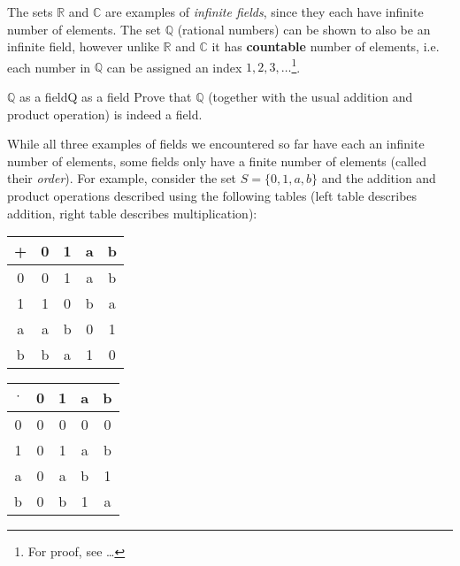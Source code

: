The sets $\mathbb{R}$ and $\mathbb{C}$ are examples of \emph{infinite fields}, since they each have infinite number of elements. The set $\mathbb{Q}$ (rational numbers) can be shown to also be an infinite field, however unlike $\mathbb{R}$ and $\mathbb{C}$ it has \textbf{countable} number of elements, i.e. each number in $\mathbb{Q}$ can be assigned an index $1,2,3,\dots$\footnote{For proof, see \ldots}.

\begin{challange}{$\bm{\mathbb{Q}}$ as a field}{Q as a field}
	Prove that $\mathbb{Q}$ (together with the usual addition and product operation) is indeed a field.
\end{challange}

While all three examples of fields we encountered so far have each an infinite number of elements, some fields only have a finite number of elements (called their \emph{order}). For example, consider the set $S=\{0,1,a,b\}$ and the addition and product operations described using the following tables (left table describes addition, right table describes multiplication):

\centering
\begin{tabular}[]{c|cccc}
	+ & 0 & 1 & a & b\\
	\midrule
	0 & 0 & 1 & a & b\\
	1 & 1 & 0 & b & a\\
	a & a & b & 0 & 1\\
	b & b & a & 1 & 0\\
\end{tabular}\hspace{2cm}
\begin{tabular}[]{c|cccc}
	$\cdot$ & 0 & 1 & a & b\\
	\midrule
	0 & 0 & 0 & 0 & 0\\
	1 & 0 & 1 & a & b\\
	a & 0 & a & b & 1\\
	b & 0 & b & 1 & a\\
\end{tabular}

